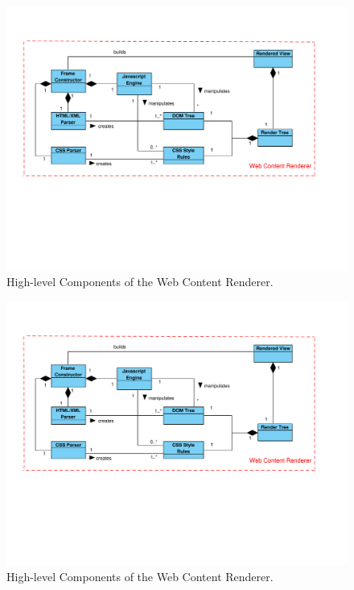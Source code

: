 \documentclass[prodmode,acmtecs]{acmsmall}
\begin{document}
    \begin{figure}[h!t]
      \vspace*{-1.5cm}
      \centering
      \hspace*{-0.5cm}\includegraphics[scale=0.56]{figures/WebContentRenderer-v2.pdf}
      \vspace*{-4.5cm}
      \caption{High-level Components of the Web Content Renderer.}
      \label{fig:WCR}
    \end{figure}

    \begin{figure}[h!t]
      \vspace*{-1.5cm}
      \centering
      \hspace*{-0.5cm}\includegraphics[scale=0.56]{figures/WebContentRenderer-v2.pdf}
      \vspace*{-4.5cm}
      \caption{High-level Components of the Web Content Renderer.}
      \label{fig:WCR}
    \end{figure}
\end{document}
